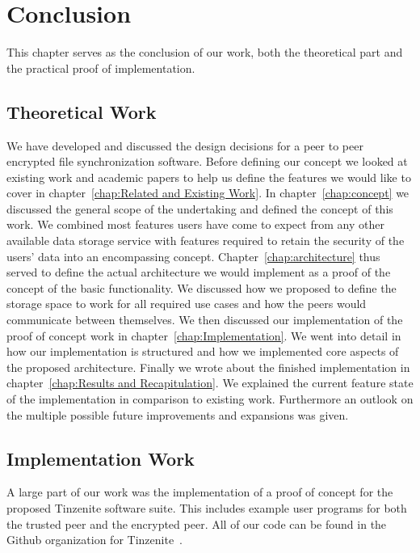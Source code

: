 \chapter{Conclusion}
\label{chap:conclusion}

This chapter serves as the conclusion of our work, both the theoretical part and the practical proof of implementation.

\section{Theoretical Work}
\label{sec:Theoretical Work}

We have developed and discussed the design decisions for a peer to peer encrypted file synchronization software.
Before defining our concept we looked at existing work and academic papers to help us define the features we would like to cover in chapter~\ref{chap:Related and Existing Work}.
In chapter~\ref{chap:concept} we discussed the general scope of the undertaking and defined the concept of this work.
We combined most features users have come to expect from any other available data storage service with features required to retain the security of the users' data into an encompassing concept.
Chapter~\ref{chap:architecture} thus served to define the actual architecture we would implement as a proof of the concept of the basic functionality.
We discussed how we proposed to define the storage space to work for all required use cases and how the peers would communicate between themselves.
We then discussed our implementation of the proof of concept work in chapter~\ref{chap:Implementation}.
We went into detail in how our implementation is structured and how we implemented core aspects of the proposed architecture.
Finally we wrote about the finished implementation in chapter~\ref{chap:Results and Recapitulation}.
We explained the current feature state of the implementation in comparison to existing work.
Furthermore an outlook on the multiple possible future improvements and expansions was given.

\section{Implementation Work}
\label{sec:Implementation Work}

A large part of our work was the implementation of a proof of concept for the proposed Tinzenite software suite.
This includes example user programs for both the trusted peer and the encrypted peer.
All of our code can be found in the Github organization for Tinzenite~\cite{web:site:github:tinzenite}.

